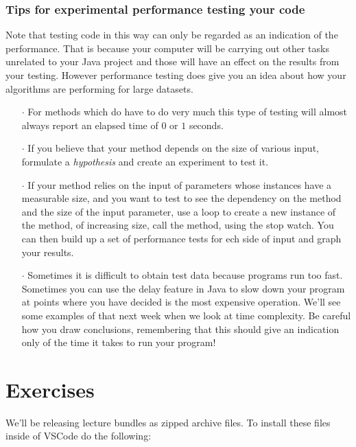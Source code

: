 \documentclass[twoside=false,DIV=14]{scrartcl}
\begin{document}
\subsubsection*{Tips for experimental performance testing your code}

Note that testing code in this way can only be regarded as an indication of the performance. That is because  your computer will be carrying out other tasks unrelated to your Java project and those will have an effect on the results from your testing. However performance testing does give you an idea about how your algorithms are performing for large datasets.



\begin{itemize}
\item[$\cdot$] For methods which do have to do very much this type of testing will almost always report an elapsed time of $0$ or $1$ seconds.

\item[$\cdot$]  If you believe that your method depends on the size of various input, formulate a \emph{hypothesis} and create an experiment to test it.

\item[$\cdot$]  If your method relies on the input of parameters whose instances have a measurable size, and you want to test to see the dependency on the method and the size of the input parameter, use a loop to create a new instance of the method, of increasing size, call the method, using the stop watch. You can then build up a set of performance tests for ech side of input and graph your results.

\item[$\cdot$]  Sometimes it is difficult to obtain test data because programs run too fast. Sometimes you can use the delay feature in Java to slow down your program at points where you have decided is the most expensive operation. We'll see some examples of that next week when we look at time complexity. Be careful how you draw conclusions, remembering that this should give an indication only of the time it takes to run your program!
\end{itemize}

\section{Exercises}

We'll be releasing lecture bundles as zipped archive files. To install these files inside of VSCode do the following:
\end{document}
